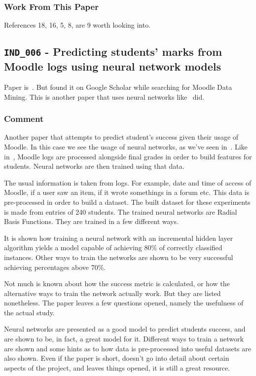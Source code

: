 \subsubsection{Work From This Paper}

References 18, 16, 5, 8, are 9 worth looking into.

\subsection{\texttt{IND\_006} - Predicting students' marks from Moodle logs using
neural network models}

Paper is~\cite{ind_006}. But found it on Google Scholar while searching for
Moodle Data Mining. This is another paper that uses neural networks
like~\cite{ind_003} did.

\subsubsection{Comment}

Another paper that attempts to predict student's success given their usage of
Moodle. In this case we see the usage of neural networks, as we've seen
in~\cite{ind_003}. Like in~\cite{ind_001, ind_002, ind_004, ind_005}, Moodle
logs are processed alongside final grades in order to build features for
students.  Neural networks are then trained using that data.

The usual information is taken from logs. For example, date and time of access
of Moodle, if a user saw an item, if it wrote somethings in a forum etc. This
data is pre-processed in order to build a dataset. The built dataset for these
experiments is made from entries of 240 students. The trained neural networks
are Radial Basis Functions. They are trained in a few different ways.

It is shown how training a neural network with an incremental hidden layer
algorithm yields a model capable of achieving 80\% of correctly classified
instances. Other ways to train the networks are shown to be very successful
achieving percentages above 70\%.

Not much is known about how the success metric is calculated, or how the
alternative ways to train the network actually work. But they are listed
nonetheless. The paper leaves a few questions opened, namely the usefulness of
the actual study.

Neural networks are presented as a good model to predict students success, and
are shown to be, in fact, a great model for it. Different ways to train a
network are shown and some hints as to how data is pre-processed into useful
datasets are also shown. Even if the paper is short, doesn't go into detail
about certain aspects of the project, and leaves things opened, it is still a
great resource.

